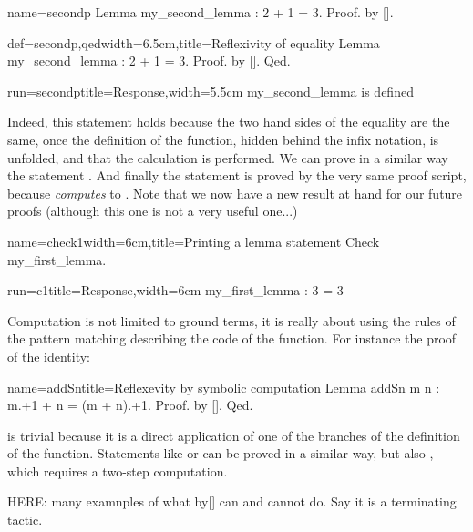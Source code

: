 \begin{coqdef}{name=secondp}
Lemma my_second_lemma : 2 + 1 = 3.
Proof. by [].
\end{coqdef}
\begin{coq}{def=secondp,qed}{width=6.5cm,title=Reflexivity of equality}
Lemma my_second_lemma : 2 + 1 = 3.
Proof. by []. Qed.
\end{coq}
\begin{coqout}{run=secondp}{title=Response,width=5.5cm}
my_second_lemma is defined
\end{coqout}


Indeed, this statement holds because the two hand sides of the equality
are the same, once the definition of the  function, hidden
behind the infix \C{+} notation, is unfolded, and that the calculation
is performed. We can prove in a similar way the statement . And finally the statement  is proved by the very same
proof script, because  \emph{computes} to
.
Note that we now have a new result at hand for our future proofs
(although this one is not a very useful one...)

\begin{coq}{name=check1}{width=6cm,title=Printing a lemma statement}
Check my_first_lemma.
\end{coq}
\begin{coqout}{run=c1}{title=Response,width=6cm}
my_first_lemma : 3 = 3
\end{coqout}

Computation is not limited to ground terms, it is really about using
the rules of the pattern matching describing the code of the
function. 
For instance the proof of the  identity:


\begin{coq}{name=addSn}{title=Reflexevity by symbolic computation}
Lemma addSn m n : m.+1 + n = (m + n).+1. Proof. by []. Qed.
\end{coq}
is trivial because it is a direct application of one of the branches
of the definition of the  function. Statements like
 or  can be proved in a similar way, but
also , which requires a two-step computation.

HERE: many examnples of what by[] can and cannot do.
Say it is a terminating tactic.

